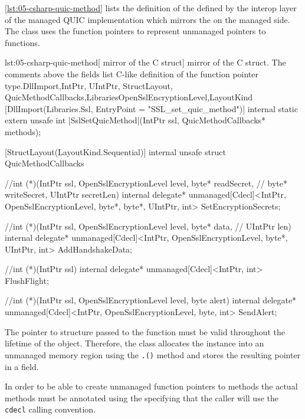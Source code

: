 \autoref{lst:05-csharp-quic-method} lists the definition of the  defined
by the interop layer of the managed QUIC implementation which mirrors the 
on the managed \dotnet{} side. The  class uses the \csharp{} function
pointers to represent unmanaged pointers to \csharp{} functions.

\begin{myListingCsharp}{lst:05-csharp-quic-method}{[\csharp{} mirror of the  C struct]\csharp{} mirror of the  C struct. The comments above the fields list C-like definition of the function pointer type.}{DllImport,IntPtr, UIntPtr, StructLayout, QuicMethodCallbacks,Libraries}{OpenSslEncryptionLevel,LayoutKind}
[DllImport(Libraries.Ssl, EntryPoint = "SSL_set_quic_method")]
internal static extern unsafe int |SslSetQuicMethod|(IntPtr ssl,
    QuicMethodCallbacks* methods);

[StructLayout(LayoutKind.Sequential)]
internal unsafe struct QuicMethodCallbacks
{
    //int (*)(IntPtr ssl, OpenSslEncryptionLevel level, byte* readSecret,
    //        byte* writeSecret, UIntPtr secretLen)
    internal delegate* unmanaged[Cdecl]<IntPtr, OpenSslEncryptionLevel,
        byte*, byte*, UIntPtr, int> SetEncryptionSecrets;

    //int (*)(IntPtr ssl, OpenSslEncryptionLevel level, byte* data,
    //        UIntPtr len)
    internal delegate* unmanaged[Cdecl]<IntPtr, OpenSslEncryptionLevel,
        byte*, UIntPtr, int> AddHandshakeData;

    //int (*)(IntPtr ssl)
    internal delegate* unmanaged[Cdecl]<IntPtr, int> FlushFlight;

    //int (*)(IntPtr ssl, OpenSslEncryptionLevel level, byte alert)
    internal delegate* unmanaged[Cdecl]<IntPtr, OpenSslEncryptionLevel, byte,
        int> SendAlert;
}
\end{myListingCsharp}

The pointer to  structure passed to the 
function must be valid throughout the lifetime of the \SSLCTX{} object. Therefore, the \OpenSslTls{}
class allocates the  instance into an unmanaged memory region using the
\texttt{.()} method and stores the resulting pointer in a
 field.

In order to be able to create unmanaged function pointers to \csharp{} methods the actual methods
must be annotated using the  specifying that the caller will
use the \texttt{cdecl} calling convention.

